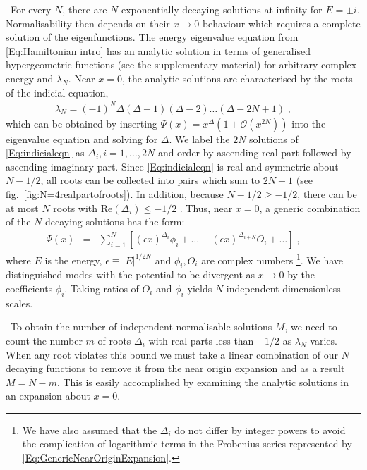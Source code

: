 \documentclass[aps,prl,reprint,preprintnumbers]{revtex4-1}
\renewcommand{\Re}{\mathrm{Re}}
\begin{document}
{\ For every $N$, there are $N$ exponentially decaying solutions at infinity for $E=\pm i$. Normalisability then depends on their $x \rightarrow 0$ behaviour which requires a complete solution of the eigenfunctions. The energy eigenvalue equation from \eqref{Eq:Hamiltonian intro} has an analytic solution in terms of generalised hypergeometric functions \cite{luke1969special} (see the supplementary material) for arbitrary complex energy and $\lambda_{N}$. Near $x = 0$, the analytic solutions are characterised by the roots of the indicial equation,
  \begin{eqnarray}
    \label{Eq:indicialeqn}
    \lambda_{N} = (-1)^{N} \Delta( \Delta - 1) (\Delta-2) \ldots (\Delta - 2 N + 1 ) \; , \qquad
  \end{eqnarray}
which can be obtained by inserting $\Psi(x) = x^{\Delta} (1 + \mathcal{O}(x^{2N}) )$ into the eigenvalue equation and solving for $\Delta$. We label the $2N$ solutions of \eqref{Eq:indicialeqn} as $\Delta_{i}, i =1, \ldots, 2N$ and order by ascending real part followed by ascending imaginary part. Since \eqref{Eq:indicialeqn} is real and symmetric about $N-1/2$, all roots can be collected into pairs which sum to $2N-1$ (see fig.~\ref{fig:N=4realpartofroots}). In addition, because $N-1/2 \geq -1/2$, there can be at most $N$ roots with $\Re(\Delta_{i}) \leq -1/2$ . Thus, near $x = 0$, a generic combination of the $N$ decaying solutions has the form: 
  \begin{eqnarray}
    \label{Eq:GenericNearOriginExpansion}
    \Psi(x) &=& \sum_{i=1}^{N} \left[ \left( \epsilon x \right)^{\Delta_{i}} \phi_{i} + \ldots + \left( \epsilon x \right)^{\Delta_{i+N}}  O_{i} + \ldots \right]
    \; , \qquad
  \end{eqnarray}
where $E$ is the energy, $\epsilon \equiv |E|^{1/2N}$ and $\phi_{i},O_{i}$ are complex numbers \footnote{We have also assumed that the $\Delta_{i}$ do not differ by integer powers to avoid the complication of logarithmic terms in the Frobenius series represented by \eqref{Eq:GenericNearOriginExpansion}.}. We have distinguished modes with the potential to be divergent as $x\rightarrow 0$ by the coefficients $\phi_{i}$. Taking ratios of $O_{i}$ and $\phi_{i}$ yields $N$ independent dimensionless scales.}

{\ To obtain the number of independent normalisable solutions $M$, we need to count the number $m$ of roots $\Delta_{i}$ with real parts less than $-1/2$ as $\lambda_{N}$ varies. When any root violates this bound we must take a linear combination of our $N$ decaying functions to remove it from the near origin expansion and as a result $M = N - m$. This is easily accomplished by examining the analytic solutions in an expansion about $x=0$.}
\end{document}
